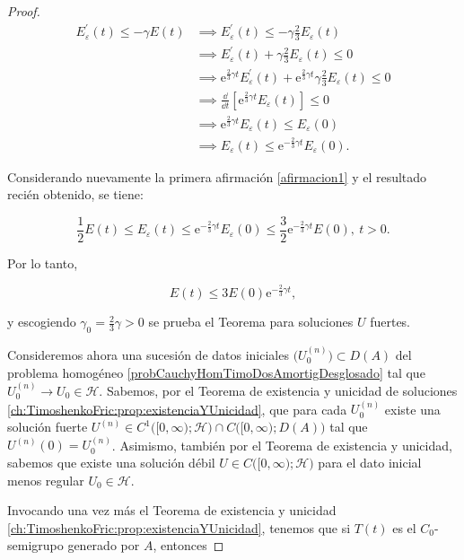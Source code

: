 \begin{proof}
    \begin{align*}
        E^\prime_\varepsilon(t) \leq -\gamma E(t) &\implies E^\prime_\varepsilon(t) \leq -\gamma\frac{2}{3} E_\varepsilon(t)\\
        &\implies E^\prime_\varepsilon(t) + \gamma\frac{2}{3} E_\varepsilon(t) \leq 0\\
        &\implies \mathrm{e}^{\frac{2}{3}\gamma t}E^\prime_\varepsilon(t) + \mathrm{e}^{\frac{2}{3}\gamma t}\gamma\frac{2}{3} E_\varepsilon(t) \leq 0\\
        &\implies \frac{\dd}{\dd t}\left[\mathrm{e}^{\frac{2}{3}\gamma t}E_\varepsilon(t)\right] \leq 0\\
        &\implies \mathrm{e}^{\frac{2}{3}\gamma t}E_\varepsilon(t) \leq E_\varepsilon(0)\\
        &\implies E_\varepsilon(t) \leq \mathrm{e}^{-\frac{2}{3}\gamma t}E_\varepsilon(0).
    \end{align*}

    Considerando nuevamente la primera afirmación \eqref{afirmacion1} y el resultado recién obtenido, se tiene:

    \[\frac{1}{2}E(t) \leq E_\varepsilon(t) \leq \mathrm{e}^{-\frac{2}{3}\gamma t}E_\varepsilon(0) \leq \frac{3}{2}\mathrm{e}^{-\frac{2}{3}\gamma t}E(0), \ t > 0.\]

    Por lo tanto,

    \[E(t) \leq 3E(0)\mathrm{e}^{-\frac{2}{3}\gamma t},\]

    y escogiendo $\displaystyle\gamma_0 = \frac{2}{3}\gamma > 0$ se prueba el Teorema para soluciones $U$ fuertes.
    
    Consideremos ahora una sucesión de datos iniciales $\Big(U_0^{(n)}\Big) \subset D(A)$ del problema homogéneo \eqref{probCauchyHomTimoDosAmortigDesglosado} tal que $U_0^{(n)} \rightarrow U_0 \in \mathcal{H}$. Sabemos, por el Teorema de existencia y unicidad de soluciones \ref{ch:TimoshenkoFric:prop:existenciaYUnicidad}, que para cada $U_0^{(n)}$ existe una solución fuerte $U^{(n)} \in C^1\big([0, \infty); \mathcal{H}\big) \cap C\big([0,\infty);D(A)\big)$ tal que $U^{(n)}(0) = U_0^{(n)}$. Asimismo, también por el Teorema de existencia y unicidad, sabemos que existe una solución débil $U \in C\big([0,\infty); \mathcal{H}\big)$ para el dato inicial menos regular $U_0 \in \mathcal{H}$.

    Invocando una vez más el Teorema de existencia y unicidad \ref{ch:TimoshenkoFric:prop:existenciaYUnicidad}, tenemos que si $T(t)$ es el $C_0$-semigrupo generado por $A$, entonces


\end{proof}
